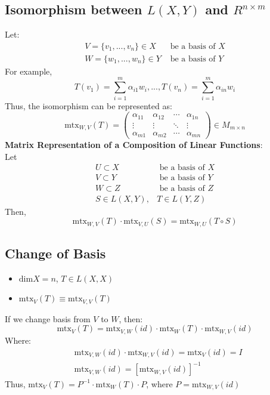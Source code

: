 \documentclass{article}
\begin{document}
\subsection{Isomorphism between $L(X,Y)$ and $R^{n\times m}$}
Let:
\begin{align*}
	V=\{v_1,...,v_n\}\in X 	&\text{ be a basis of } X 	\\
	W=\{w_1,...,w_n\}\in Y 	&\text{ be a basis of } Y 	
\end{align*}
For example, 
\[
	T(v_1)=\sum_{i=1}^m \alpha_{i1}w_i,...,T(v_n)=\sum_{i=1}^m \alpha_{in}w_i
\]
Thus, the isomorphism can be represented as:
\[
	\text{mtx}_{W,V}(T)=
	\begin{pmatrix}
		\alpha_{11} & \alpha_{12} 	& \cdots 	& \alpha_{1n} 	\\
		\vdots 		& \vdots 		& \ddots	& \vdots		\\
		\alpha_{m1} & \alpha_{m2}	& \cdots 	& \alpha_{mn}
	\end{pmatrix}
	\in M_{m\times n}
\]
\textbf{Matrix Representation of a Composition of Linear Functions}: \\
Let 
\begin{align*}
	U\subset X &\text{ be a basis of } X \\
	V\subset Y &\text{ be a basis of } Y \\
	W\subset Z &\text{ be a basis of } Z \\
	S\in L(X,Y),&T\in L(Y,Z)
\end{align*}
Then,
\[
	\text{mtx}_{W,V}(T)\cdot\text{mtx}_{V,U}(S)=\text{mtx}_{W,U}(T\circ S)
\]

\subsection{Change of Basis}
\begin{itemize}
	\item $\text{dim}X=n$, $T\in L(X,X)$
	\item $\text{mtx}_V(T)\equiv\text{mtx}_{V,V}(T)$
\end{itemize}
If we change basis from $V$ to $W$, then:
\[
	\text{mtx}_V(T)=\text{mtx}_{V,W}(id)\cdot\text{mtx}_W(T)\cdot\text{mtx}_{W,V}(id)
\]
Where:
\begin{align*}
	&\text{mtx}_{V,W}(id)\cdot\text{mtx}_{W,V}(id)=\text{mtx}_{V}(id)=I \\
	&\text{mtx}_{V,W}(id) = [\text{mtx}_{W,V}(id)]^{-1}
\end{align*}
Thus, $\text{mtx}_V(T)=P^{-1}\cdot\text{mtx}_W(T)\cdot P$, where $P=\text{mtx}_{W,V}(id)$
\end{document}
